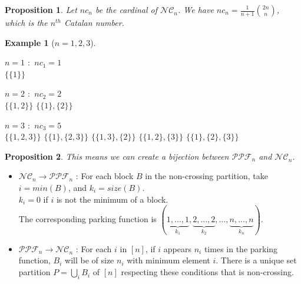 \documentclass[12pt]{article}
\newtheorem*{prop}{Proposition}
\newtheorem*{example}{Example}
\begin{document}
\begin{prop}
    Let $nc_n$ be the cardinal of $\mathcal{NC}_n$.
    We have $nc_n = \frac{1}{n + 1} \binom{2n}{n}$,
    which is the $n^{th}$ Catalan number.
\end{prop}

\begin{example}[$n = 1, 2, 3$]
    \text{}\\
    \begin{itemize*}
        \item $n = 1$ \text{ } $:$ \text{ } $nc_1 = 1$\\
        \subitem $\{\{1\}\}$\\
        \item $n = 2$ \text{ } $:$ \text{ } $nc_2 = 2$\\
        \subitem $\{\{1, 2\}\}$
        \subitem $\{\{1\}, \{2\}\}$\\
        \item $n = 3$ \text{ } $:$ \text{ } $nc_3 = 5$\\
        \subitem $\{\{1, 2, 3\}\}$
        \subitem $\{\{1\}, \{2, 3\}\}$
        \subitem $\{\{1, 3\}, \{2\}\}$
        \subitem $\{\{1, 2\}, \{3\}\}$
        \subitem $\{\{1\}, \{2\}, \{3\}\}$\\
    \end{itemize*}
\end{example}

\begin{prop}
    This means we can create a \emph{bijection} between
    $\mathcal{PPF}_n$ and $\mathcal{NC}_n$.
\end{prop}

\begin{itemize}
    \item $\mathcal{NC}_n \to \mathcal{PPF}_n$ :
    For each block $B$ in the non-crossing partition, take
    $i = min (B)$, and $k_i = size (B)$.\\
    $k_i = 0$ if $i$ is not the minimum of a block.\\
    The corresponding parking function is
    $(\underbrace{1, \ldots, 1}_{k_1}, \underbrace{2, \ldots,
    2}_{k_2}, \ldots, \underbrace{n, \ldots, n}_{k_n})$.\\
    \item $\mathcal{PPF}_n \to \mathcal{NC}_n$ :
    For each $i$ in $[n]$, if $i$ appears $n_i$ times in the
    parking function, $B_i$ will be of size $n_i$ with minimum
    element $i$.
    There is a unique set partition $\displaystyle P = \bigcup_{i}{B_i}$
    of $[n]$ respecting these conditions that is non-crossing.
\end{itemize}
\end{document}
